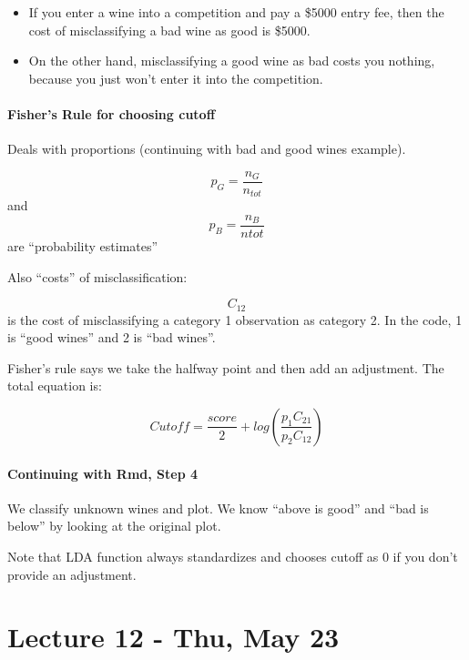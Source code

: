 \documentclass[]{article}
\providecommand{\tightlist}{%
  \setlength{\itemsep}{0pt}\setlength{\parskip}{0pt}}
\let\oldparagraph\paragraph
\renewcommand{\paragraph}[1]{\oldparagraph{#1}\mbox{}}
\begin{document}
\begin{itemize}
\begin{itemize}
    \begin{itemize}
    \tightlist
    \item
      If you enter a wine into a competition and pay a \$5000 entry fee,
      then the cost of misclassifying a bad wine as good is \$5000.
    \item
      On the other hand, misclassifying a good wine as bad costs you
      nothing, because you just won't enter it into the competition.
    \end{itemize}
  \end{itemize}
\end{itemize}

\hypertarget{fishers-rule-for-choosing-cutoff}{%
\paragraph{Fisher's Rule for choosing
cutoff}\label{fishers-rule-for-choosing-cutoff}}

Deals with proportions (continuing with bad and good wines example).

\[p_G = \frac{n_G}{n_{tot}}\] and \[p_B = \frac{n_B}{n{tot}}\] are
``probability estimates''

Also ``costs'' of misclassification:

\[C_{12}\] is the cost of misclassifying a category 1 observation as
category 2. In the code, 1 is ``good wines'' and 2 is ``bad wines''.

Fisher's rule says we take the halfway point and then add an adjustment.
The total equation is:

\[Cutoff = \frac{score}{2} + log(\frac{p_1C_{21}}{p_2C_{12}})\]

\hypertarget{continuing-with-rmd-step-4}{%
\paragraph{Continuing with Rmd, Step
4}\label{continuing-with-rmd-step-4}}

We classify unknown wines and plot. We know ``above is good'' and ``bad
is below'' by looking at the original plot.

Note that LDA function always standardizes and chooses cutoff as 0 if
you don't provide an adjustment.

\hypertarget{lecture-12---thu-may-23}{%
\section{Lecture 12 - Thu, May 23}\label{lecture-12---thu-may-23}}
\end{document}
